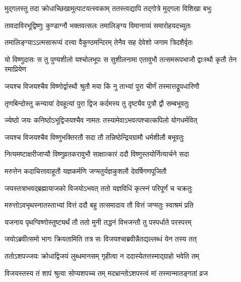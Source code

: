\twolineshloka
{मुद्गलस्तु तदा क्रोधाच्छिखामुत्पाटयत्स्वकाम्}
{ततस्त्वद्यापि तद्गोत्रे मुद्गला विशिखा बभुः} %

\twolineshloka
{तावदाविरभूद्विष्णुः कुण्डाग्नौ भक्तवत्सलः}
{तमालिङ्ग्य विमानाग्र्यं समारोहयदच्युतः} %

\twolineshloka
{तमालिङ्ग्याऽऽत्मसारूप्यं दत्त्वा वैकुण्ठमन्दिरम्}
{तेनैव सह देवेशो जगाम त्रिदशैर्वृतः} %


\fourlineindentedshloka
{यो विष्णुदासः स तु पुण्यशीलो}
{यश्चोलभूपः स सुशीलनामा}
{एतावुभौ तत्समरूपभाजौ}
{द्वाःस्थौ कृतौ तेन रमाप्रियेण} %





\twolineshloka
{जयश्च विजयश्चैव विष्णोर्द्वास्थौ श्रुतौ मया}
{किं नु ताभ्यां पुरा चीर्णं तस्मात्तद्रूपधारिणौ} %


\twolineshloka
{तृणबिन्दोस्तु कन्यायां देवहूत्यां पुरा द्विज}
{कर्दमस्य तु दृष्ट्यैव पुत्रौ द्वौ सम्बभूवतुः} %


\twolineshloka
{ज्येष्ठो जयः कनिष्ठोऽभूद्विजयश्चैव नामतः}
{तस्यामेवाऽभवत्पश्चात्कपिलो योगधर्मवित्} %

\twolineshloka
{जयश्च विजयश्चैव विष्णुभक्तिरतौ सदा}
{तौ तन्निष्ठेन्द्रियग्रामौ धर्मशीलौ बभूवतुः} %

\twolineshloka
{नित्यमष्टाक्षरीजाप्यौ विष्णुव्रतकरावुभौ}
{साक्षात्कारं ददौ विष्णुस्तयोर्नित्यार्चने सदा} %

\twolineshloka
{मरुत्तेन कदाचित्तावाहूतौ यज्ञकर्मणि}
{जग्मतुर्यज्ञकुशलौ देवर्षिगणपूजितौ} %

\twolineshloka
{जयस्तत्राभवद्ब्रह्मायाजको विजयोऽभवत्}
{ततो यज्ञविधिं कृत्स्नं परिपूर्णं च चक्रतुः} %

\twolineshloka
{मरुत्तोऽवभृथस्नातस्ताभ्यां वित्तं ददौ बहु}
{तत्समादाय तौ वित्तं जग्मतुः स्वाश्रमं प्रति} %

\twolineshloka
{यजनाय पृथग्विष्णोस्तुष्ट्यर्थं तौ ततो मुनी}
{तद्धनं विभजन्तौ तु पस्पर्धाते परस्परम्} %

\twolineshloka
{जयोऽब्रवीत्समो भागः क्रियतामिति तत्र सः}
{विजयश्चाब्रवीन्नैतद्यल्लब्धं येन तस्य तत्} %

\twolineshloka
{ततोऽशपज्जयः क्रोधाद्विजयं लुब्धमानसम्}
{गृहीत्वा न ददास्येतत्तस्माद्ग्राहो भवेति तम्} %

\twolineshloka
{विजयस्तस्य तं शापं श्रुत्वा सोप्यशपच्च तम्}
{मदभ्रान्तोऽशपस्त्वं मां तस्मान्मातङ्गतां व्रज} %

